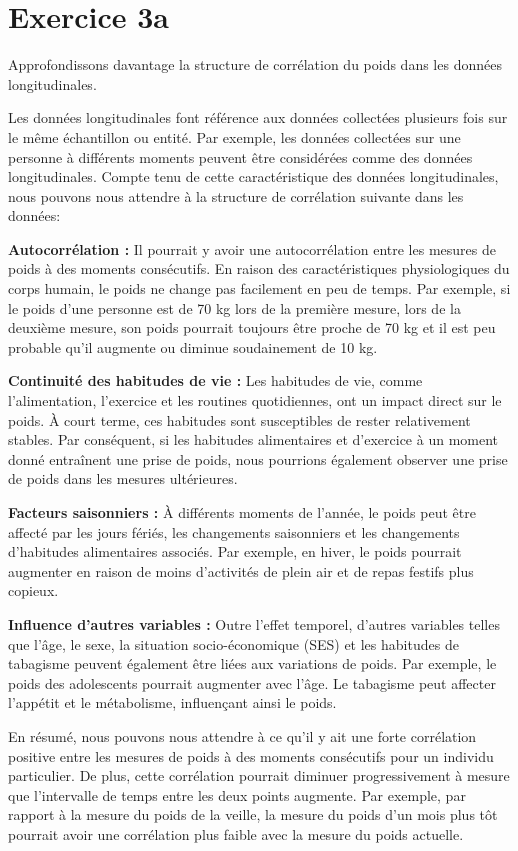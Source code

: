 \documentclass[12pt,a4paper]{article}
\begin{document}
\section{Exercice 3a}

Approfondissons davantage la structure de corrélation du poids dans les données longitudinales.

Les données longitudinales font référence aux données collectées plusieurs fois sur le même échantillon ou entité. Par exemple, les données collectées sur une personne à différents moments peuvent être considérées comme des données longitudinales. Compte tenu de cette caractéristique des données longitudinales, nous pouvons nous attendre à la structure de corrélation suivante dans les données:

\textbf{Autocorrélation :} Il pourrait y avoir une autocorrélation entre les mesures de poids à des moments consécutifs. En raison des caractéristiques physiologiques du corps humain, le poids ne change pas facilement en peu de temps. Par exemple, si le poids d'une personne est de 70 kg lors de la première mesure, lors de la deuxième mesure, son poids pourrait toujours être proche de 70 kg et il est peu probable qu'il augmente ou diminue soudainement de 10 kg.

\textbf{Continuité des habitudes de vie :} Les habitudes de vie, comme l'alimentation, l'exercice et les routines quotidiennes, ont un impact direct sur le poids. À court terme, ces habitudes sont susceptibles de rester relativement stables. Par conséquent, si les habitudes alimentaires et d'exercice à un moment donné entraînent une prise de poids, nous pourrions également observer une prise de poids dans les mesures ultérieures.

\textbf{Facteurs saisonniers :} À différents moments de l'année, le poids peut être affecté par les jours fériés, les changements saisonniers et les changements d'habitudes alimentaires associés. Par exemple, en hiver, le poids pourrait augmenter en raison de moins d'activités de plein air et de repas festifs plus copieux.

\textbf{Influence d'autres variables :} Outre l'effet temporel, d'autres variables telles que l'âge, le sexe, la situation socio-économique (SES) et les habitudes de tabagisme peuvent également être liées aux variations de poids. Par exemple, le poids des adolescents pourrait augmenter avec l'âge. Le tabagisme peut affecter l'appétit et le métabolisme, influençant ainsi le poids.

En résumé, nous pouvons nous attendre à ce qu'il y ait une forte corrélation positive entre les mesures de poids à des moments consécutifs pour un individu particulier. De plus, cette corrélation pourrait diminuer progressivement à mesure que l'intervalle de temps entre les deux points augmente. Par exemple, par rapport à la mesure du poids de la veille, la mesure du poids d'un mois plus tôt pourrait avoir une corrélation plus faible avec la mesure du poids actuelle.
\end{document}
